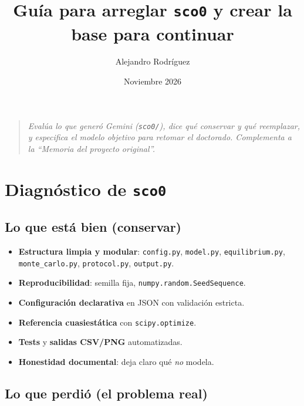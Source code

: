 \documentclass[11pt,a4paper]{article}
\title{\bfseries Guía para arreglar \texttt{sco0} y crear la base para continuar}
\author{Alejandro Rodríguez}
\date{Noviembre 2026}
\begin{document}
\maketitle

\begin{quote}
\emph{Evalúa lo que generó Gemini (\texttt{sco0/}), dice qué conservar y qué
reemplazar, y especifica el modelo objetivo para retomar el doctorado.
Complementa a la ``Memoria del proyecto original''.}
\end{quote}

\tableofcontents

\section{Diagnóstico de \texttt{sco0}}

\subsection{Lo que está bien (conservar)}

\begin{itemize}
\item \textbf{Estructura limpia y modular}: \texttt{config.py}, \texttt{model.py},
  \texttt{equilibrium.py}, \texttt{monte\_carlo.py}, \texttt{protocol.py},
  \texttt{output.py}.
\item \textbf{Reproducibilidad}: semilla fija, \texttt{numpy.random.SeedSequence}.
\item \textbf{Configuración declarativa} en JSON con validación estricta.
\item \textbf{Referencia cuasiestática} con \texttt{scipy.optimize}.
\item \textbf{Tests} y \textbf{salidas CSV/PNG} automatizadas.
\item \textbf{Honestidad documental}: deja claro qué \emph{no} modela.
\end{itemize}

\subsection{Lo que perdió (el problema real)}
\end{document}
